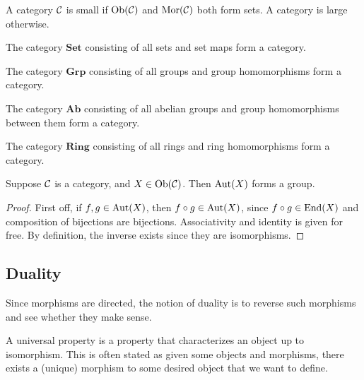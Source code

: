 \begin{definition}
    A category \(\mathcal{C}\) is small
    if \(\operatorname{Ob}(\mathcal{C})\) and \(\operatorname{Mor}(\mathcal{C})\) both form sets.
    A category is large otherwise.
\end{definition}

\begin{proposition}
    The category \(\mathbf{Set}\) consisting of all sets and set maps form a category.
\end{proposition}
\begin{proposition}
    The category \(\mathbf{Grp}\) consisting of all groups and group homomorphisms
    form a category.
\end{proposition}
\begin{proposition}
    The category \(\mathbf{Ab}\) consisting of all abelian groups
    and group homomorphisms between them form a category.
\end{proposition}
\begin{proposition}
    The category \(\mathbf{Ring}\) consisting of all rings and ring homomorphisms
    form a category.
\end{proposition}

\begin{theorem}
    Suppose \(\mathcal{C}\) is a category, and \(X \in \operatorname{Ob}(\mathcal{C})\).
    Then \(\operatorname{Aut}(X)\) forms a group.
\end{theorem}
\begin{proof}
    First off, if \(f,g \in \operatorname{Aut}(X)\),
    then \(f \circ g \in \operatorname{Aut}(X)\),
    since \(f \circ g \in \operatorname{End}(X)\) and composition of bijections are bijections.
    Associativity and identity is given for free.
    By definition, the inverse exists since they are isomorphisms.
\end{proof}


\subsection{Duality}

\begin{remark}
    Since morphisms are directed,
    the notion of duality is to reverse such morphisms
    and see whether they make sense.
\end{remark}

\begin{definition}
    A universal property is a property
    that characterizes an object up to isomorphism.
    This is often stated as given some objects and morphisms,
    there exists a (unique) morphism to some desired object that we want to define.
\end{definition}


